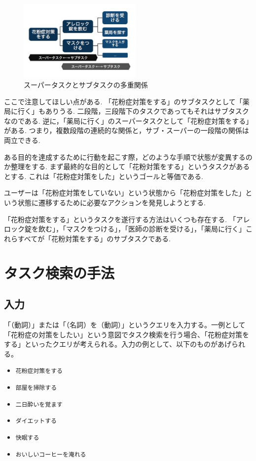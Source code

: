 \documentclass[submit,techreq]{ipsj}
\def\|{\verb|}
\begin{document}
\begin{figure}[tb]
\includegraphics[width=6cm, bb=0 0 350 319]{super_sub_sub.jpg}
\caption{スーパータスクとサブタスクの多重関係}
\label{fig:single}
\end{figure}



ここで注意してほしい点がある. 「花粉症対策をする」のサブタスクとして「薬局に行く」もありうる. 二段階，三段階下のタスクであってもそれはサブタスクなのである. 逆に，「薬局に行く」のスーパータスクとして「花粉症対策をする」がある. つまり，複数段階の連続的な関係と，サブ・スーパーの一段階の関係は両立できる.


ある目的を達成するために行動を起こす際，どのような手順で状態が変異するのか整理をする. まず最終的な目的として「花粉対策をする」というタスクがあるとする. これは「花粉症対策をした」というゴールと等価である.

ユーザーは「花粉症対策をしていない」という状態から「花粉症対策をした」という状態に遷移するために必要なアクションを発見しようとする.

「花粉症対策をする」というタスクを遂行する方法はいくつも存在する. 「アレロック錠を飲む」，「マスクをつける」，「医師の診断を受ける」，「薬局に行く」これらすべてが「花粉対策をする」のサブタスクである.



%4
\section{タスク検索の手法}

%4.1
\subsection{入力}
「（動詞）」または「（名詞）を（動詞）」というクエリを入力する。一例として「花粉症の対策をしたい」という意図でタスク検索を行う場合、「花粉症対策をする」といったクエリが考えられる。入力の例として、以下のものがあげられる。

\begin{itemize}
\item \|花粉症対策をする|
\item \|部屋を掃除する|
\item \|二日酔いを覚ます|
\item \|ダイエットする|
\item \|快眠する|
\item \|おいしいコーヒーを淹れる|
\end{itemize}
\end{document}
